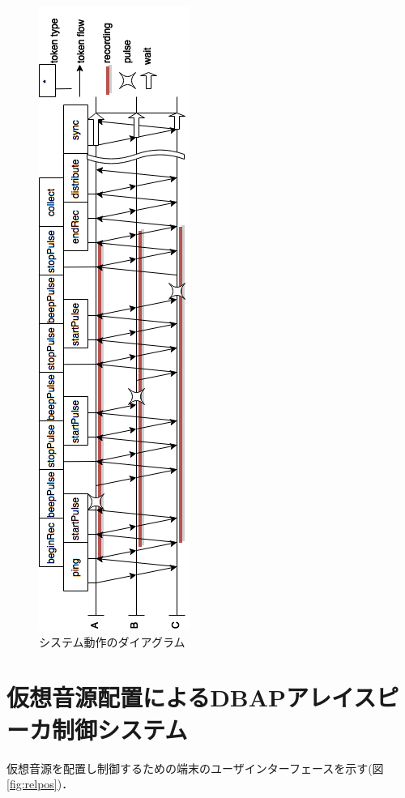 \begin{figure}[p]\centering
\hspace{-2mm}\includegraphics[clip,height=1.5\hsize]{img/flowchart.png}
\caption{システム動作のダイアグラム}\label{fig:pulsediagram}
\end{figure}


\section{仮想音源配置によるDBAPアレイスピーカ制御システム}

仮想音源を配置し制御するための端末のユーザインターフェースを示す(図\ref{fig:relpos})．

